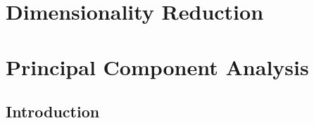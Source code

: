 \documentclass[]{article}
\begin{document}


\Large
\tableofcontents
\newpage
\section{Dimensionality Reduction}


\section{Principal Component Analysis }

\subsection{Introduction}
\end{document}
